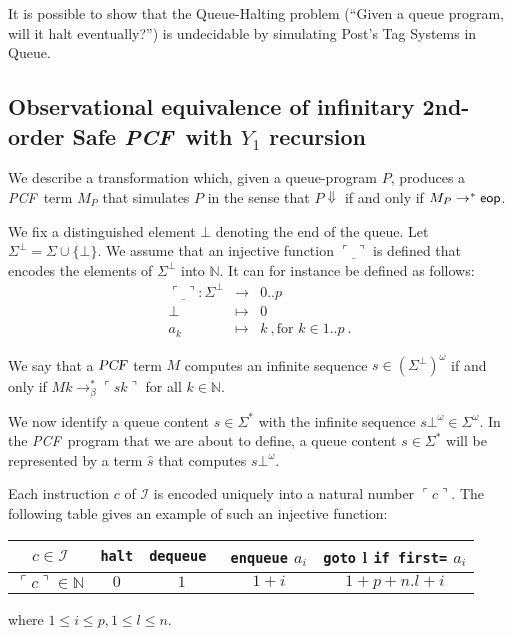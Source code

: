 \documentclass{article}
\newcommand{\encode}[1]{\ulcorner #1 \urcorner}
\newcommand{\nat}{\mathbb{N}}
\newcommand\eop{{\sf eop}}
\newcommand{\betared}{\rightarrow_\beta}
\newcommand\pcf{\textsl{PCF}}
\begin{document}
It is possible to show that the Queue-Halting problem (``Given a queue program, will it halt eventually?'') is undecidable by simulating Post's Tag Systems in Queue.

\subsection{Observational equivalence of infinitary 2nd-order Safe \pcf\ with $Y_1$ recursion}

We describe a transformation which, given a queue-program $P$, produces a \pcf\ term $M_P$ that simulates $P$ in the sense that $P \Downarrow$ if and only if $M_P \rightarrow^* \eop$.

We fix a distinguished element $\bot$ denoting the end of the queue. Let $\Sigma^\bot = \Sigma \cup \{ \bot \}$. We assume that an injective function $\encode{\underline{\ }}$ is defined that encodes  the
elements of $\Sigma^\bot$ into $\nat$. It can for instance be defined as follows:
\begin{eqnarray*}
\encode{\underline{\ }} : \Sigma^\bot &\longrightarrow& 0..p \\
 \bot &\mapsto& 0 \\
 a_k &\mapsto& k \ , \mbox{for } k \in 1..p \ .
\end{eqnarray*}

We say that a $\pcf$ term $M$ computes an infinite sequence $s \in {(\Sigma^\bot)}^\omega$ if and only if
$M k \betared^* \encode{s k}$ for all $k\in \nat$.

We now identify a queue content $s \in \Sigma^*$ with the infinite sequence $s \bot^\omega \in \Sigma^\omega$. In the \pcf\ program that we are about to define, a queue content $s \in \Sigma^*$ will be represented by a term $\hat{s}$ that computes $s \bot^\omega$.

Each instruction $c$ of $\mathcal{I}$ is encoded uniquely into a natural number $\encode{ c }$. The following table gives an example of such an injective function:
\begin{center}
\begin{tabular}{c|c|c|c|c}
$c \in \mathcal{I}$ & {\tt halt} & {\tt dequeue } & {\tt enqueue} $a_i$ &  {\tt goto} l {\tt if first=} $a_i$ \\ \hline
$\encode{ c } \in \nat$ & $0$ & $1$ & $1+i$ & $1+p + n.l +i$ \\
\end{tabular}
\end{center}
where $1 \leq i \leq p, 1 \leq l \leq n$.
\end{document}
